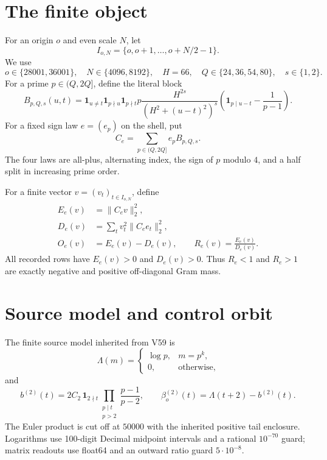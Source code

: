 \documentclass[10pt]{article}
\newcommand{\ind}{\mathbf 1}
\begin{document}
\section{The finite object}

For an origin $o$ and even scale $N$, let
\[
 I_{o,N}=\{o,o+1,\ldots,o+N/2-1\}.
\]
We use
\[
 o\in\{28001,36001\},\quad N\in\{4096,8192\},\quad
 H=66,\quad Q\in\{24,36,54,80\},\quad s\in\{1,2\}.
\]
For a prime $p\in(Q,2Q]$, define the literal block
\begin{equation}\label{eq:block}
 B_{p,Q,s}(u,t)=
 \ind_{u\ne t}\ind_{p\nmid u}\ind_{p\nmid t}
 p\frac{H^{2s}}{(H^2+(u-t)^2)^s}
 \left(\ind_{p\mid u-t}-\frac{1}{p-1}\right).
\end{equation}
For a fixed sign law $e=(e_p)$ on the shell, put
\[
 C_e=\sum_{p\in(Q,2Q]}e_pB_{p,Q,s}.
\]
The four laws are all-plus, alternating index, the sign of $p$ modulo $4$,
and a half split in increasing prime order.

For a finite vector $v=(v_t)_{t\in I_{o,N}}$, define
\begin{align}
 E_e(v)&=\|C_ev\|_2^2,\\
 D_e(v)&=\sum_t v_t^2\|C_ee_t\|_2^2,\\
 O_e(v)&=E_e(v)-D_e(v),\qquad
 R_e(v)=\frac{E_e(v)}{D_e(v)}.
\end{align}
All recorded rows have $E_e(v)>0$ and $D_e(v)>0$.  Thus $R_e<1$ and
$R_e>1$ are exactly negative and positive off-diagonal Gram mass.

\section{Source model and control orbit}

The finite source model inherited from V59 is
\[
 \Lambda(m)=
 \begin{cases}
  \log p,&m=p^k,\\
  0,&\text{otherwise},
 \end{cases}
\]
and
\begin{equation}\label{eq:source}
 b^{(2)}(t)=2C_2\,\ind_{2\nmid t}
 \prod_{\substack{p\mid t\\p>2}}\frac{p-1}{p-2},\qquad
 \beta_o^{(2)}(t)=\Lambda(t+2)-b^{(2)}(t).
\end{equation}
The Euler product is cut off at $50000$ with the inherited positive tail
enclosure.  Logarithms use 100-digit Decimal midpoint intervals and a
rational $10^{-70}$ guard; matrix readouts use float64 and an outward ratio
guard $5\cdot10^{-8}$.
\end{document}
